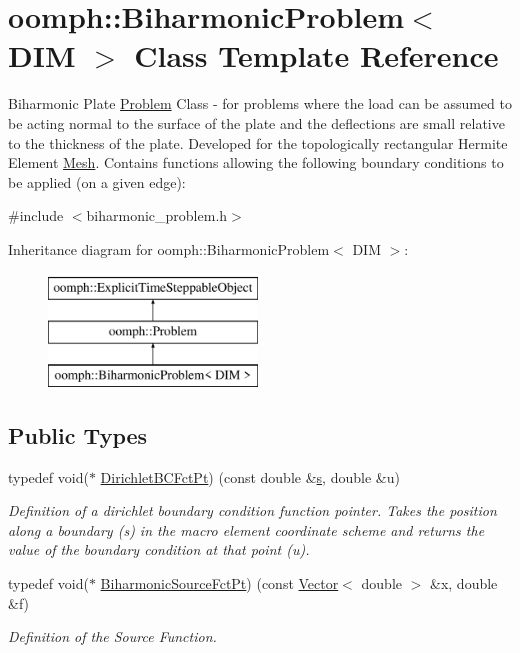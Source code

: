 \hypertarget{classoomph_1_1BiharmonicProblem}{}\section{oomph\+:\+:Biharmonic\+Problem$<$ D\+IM $>$ Class Template Reference}
\label{classoomph_1_1BiharmonicProblem}


Biharmonic Plate \hyperlink{classoomph_1_1Problem}{Problem} Class -\/ for problems where the load can be assumed to be acting normal to the surface of the plate and the deflections are small relative to the thickness of the plate. Developed for the topologically rectangular Hermite Element \hyperlink{classoomph_1_1Mesh}{Mesh}. Contains functions allowing the following boundary conditions to be applied (on a given edge)\+:  




{\ttfamily \#include $<$biharmonic\+\_\+problem.\+h$>$}

Inheritance diagram for oomph\+:\+:Biharmonic\+Problem$<$ D\+IM $>$\+:\begin{figure}[H]
\begin{center}
\leavevmode
\includegraphics[height=3.000000cm]{classoomph_1_1BiharmonicProblem}
\end{center}
\end{figure}
\subsection*{Public Types}
\begin{DoxyCompactItemize}
\item 
typedef void($\ast$ \hyperlink{classoomph_1_1BiharmonicProblem_ac3e873c52bcd489bc545f3cd2c860e8f}{Dirichlet\+B\+C\+Fct\+Pt}) (const double \&\hyperlink{cfortran_8h_ab7123126e4885ef647dd9c6e3807a21c}{s}, double \&u)
\begin{DoxyCompactList}\small\item\em Definition of a dirichlet boundary condition function pointer. Takes the position along a boundary (s) in the macro element coordinate scheme and returns the value of the boundary condition at that point (u). \end{DoxyCompactList}\item 
typedef void($\ast$ \hyperlink{classoomph_1_1BiharmonicProblem_a08d7386bbae19862d6fa656b8a2ae2a0}{Biharmonic\+Source\+Fct\+Pt}) (const \hyperlink{classoomph_1_1Vector}{Vector}$<$ double $>$ \&x, double \&f)
\begin{DoxyCompactList}\small\item\em Definition of the Source Function. \end{DoxyCompactList}\end{DoxyCompactItemize}
